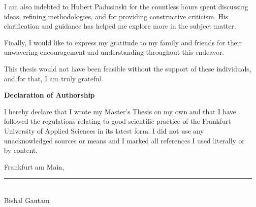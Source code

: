 {\begin{titlepage}
    I am also indebted to Hubert Padusinski for the countless hours spent discussing ideas, refining methodologies, and for providing constructive criticism. His clarification and guidance has helped me explore more in the subject matter.

    Finally, I would like to express my gratitude to my family and friends for their unwavering encouragement and understanding throughout this endeavor.

    This thesis would not have been feasible without the support of these individuals, and for that, I am truly grateful.
 \vspace*{\fill}
\end{titlepage}



\begin{titlepage}
    \vspace*{\fill}
    {\Large\textbf{Declaration of Authorship}\par}\bigskip%
    I hereby declare that I wrote my Master's Thesis on my own and that I have followed the regulations relating to good scientific practice of the Frankfurt University of Applied Sciences in its latest form. I did not use any unacknowledged sources or means and I marked all references I used literally or by content.\par\bigskip%
    Frankfurt am Main, \EndDatum\par\vspace{5ex}%
    \vspace{2ex}
    \rule{4cm}{0.4pt} %
    \vspace{0.5em} \\ Bishal Gautam
    \vspace*{\fill}
\end{titlepage}



}

\maketitle
